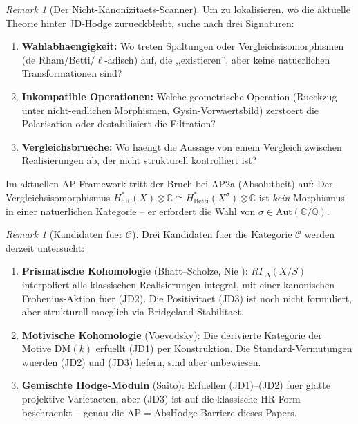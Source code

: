 \documentclass[aps,prd,twocolumn,superscriptaddress,nofootinbib]{revtex4-2}
\theoremstyle{definition}
\theoremstyle{remark}
\newtheorem{remark}[theorem]{Remark}
\begin{document}
\begin{remark}[Der Nicht-Kanonizitaets-Scanner]\label{rem:noncanonicity-scanner}
Um zu lokalisieren, wo die aktuelle Theorie hinter JD-Hodge zurueckbleibt, suche nach drei Signaturen:
\begin{enumerate}
\item \textbf{Wahlabhaengigkeit:} Wo treten Spaltungen oder Vergleichsisomorphismen (de Rham/Betti/$\ell$-adisch) auf, die ,,existieren'', aber keine natuerlichen Transformationen sind?
\item \textbf{Inkompatible Operationen:} Welche geometrische Operation (Rueckzug unter nicht-endlichen Morphismen, Gysin-Vorwaertsbild) zerstoert die Polarisation oder destabilisiert die Filtration?
\item \textbf{Vergleichsbrueche:} Wo haengt die Aussage von einem Vergleich zwischen Realisierungen ab, der nicht strukturell kontrolliert ist?
\end{enumerate}
Im aktuellen AP-Framework tritt der Bruch bei AP2a (Absolutheit) auf: Der Vergleichsisomorphismus $H^*_{\mathrm{dR}}(X) \otimes \mathbb{C} \cong H^*_{\mathrm{Betti}}(X^\sigma) \otimes \mathbb{C}$ ist \emph{kein} Morphismus in einer natuerlichen Kategorie -- er erfordert die Wahl von $\sigma \in \mathrm{Aut}(\mathbb{C}/\mathbb{Q})$.
\end{remark}

\begin{remark}[Kandidaten fuer $\mathcal{C}$]\label{rem:candidates-C}
Drei Kandidaten fuer die Kategorie $\mathcal{C}$ werden derzeit untersucht:
\begin{enumerate}
\item \textbf{Prismatische Kohomologie} (Bhatt--Scholze, Nie \cite{Nie2021}): $R\Gamma_\Delta(X/S)$ interpoliert alle klassischen Realisierungen integral, mit einer kanonischen Frobenius-Aktion fuer (JD2). Die Positivitaet (JD3) ist noch nicht formuliert, aber strukturell moeglich via Bridgeland-Stabilitaet.
\item \textbf{Motivische Kohomologie} (Voevodsky): Die derivierte Kategorie der Motive $\mathrm{DM}(k)$ erfuellt (JD1) per Konstruktion. Die Standard-Vermutungen wuerden (JD2) und (JD3) liefern, sind aber unbewiesen.
\item \textbf{Gemischte Hodge-Moduln} (Saito): Erfuellen (JD1)--(JD2) fuer glatte projektive Varietaeten, aber (JD3) ist auf die klassische HR-Form beschraenkt -- genau die AP$=$AbsHodge-Barriere dieses Papers.
\end{enumerate}
\end{remark}
\end{document}
